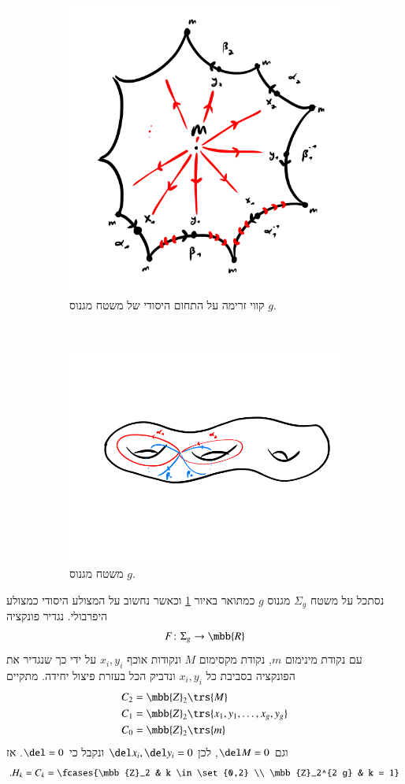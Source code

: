 \documentclass[a4paper,10pt,twoside,openany]{book}
\begin{document}
\begin{figure}[t!]
    \centering
    \begin{subfigure}[t]{0.6\textwidth}
        \centering
        \includegraphics[height=0.6\textwidth]{sources/6.1.a}
        \caption{קווי זרימה על התחום היסודי של משטח מגנוס $g$.}
    \end{subfigure}%
    ~ 
    \begin{subfigure}[t]{0.6\textwidth}
        \centering
        \includegraphics[height=0.6\textwidth]{sources/6.1.b}
        \caption{משטח מגנוס $g$.}
    \end{subfigure}
    \caption{}
    \label{6.1}
\end{figure}

\begin{example}
נסתכל על משטח
$\Sigma_g$
מגנוס
$g$
כמתואר באיור
\ref{6.1}
וכאשר נחשוב על המצולע היסודי כמצולע היפרבולי.
נגדיר פונקציה
\[F \colon \Sigma_g \to \mbb{R}\]
עם נקודת מינימום
$m$,
נקודת מקסימום
$M$
ונקודות אוכף
$x_i, y_i$
על ידי כך שנגדיר את הפונקציה בסביבת כל
$x_i, y_i$
ונדביק הכל בעזרת פיצול יחידה.
מתקיים
\begin{align*}
C_2 &= \mbb{Z}_2\trs{M} \\
C_1 &= \mbb{Z}_2\trs{x_1, y_1, \ldots, x_g, y_g} \\
C_0 &= \mbb{Z}_2\trs{m}
\end{align*}
וגם
$\del M = 0$,
לכן
$\del x_i, \del y_i = 0$
ונקבל כי
$\del = 0$.
אז
\begin{align*}
\text{.} H_k = C_k = \fcases{\mbb{Z}_2 & k \in \set{0,2} \\ \mbb{Z}_2^{2 g} & k = 1}
\end{align*}
\end{example}
\end{document}
